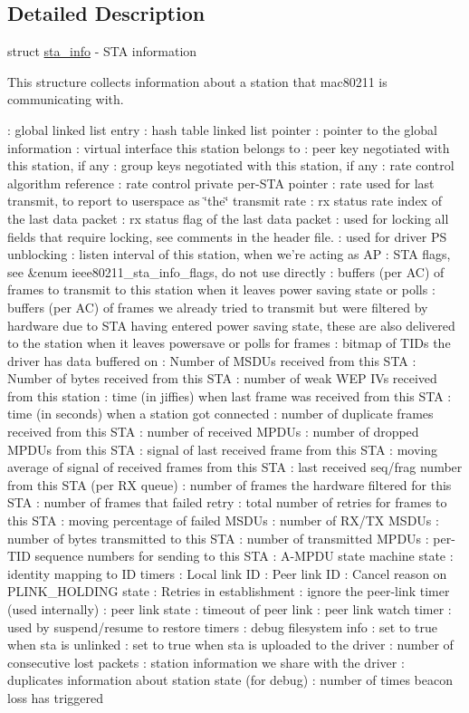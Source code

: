 \subsection{Detailed Description}
struct \hyperlink{structsta__info}{sta\-\_\-info} -\/ S\-T\-A information

This structure collects information about a station that mac80211 is communicating with.

\-: global linked list entry \-: hash table linked list pointer \-: pointer to the global information \-: virtual interface this station belongs to \-: peer key negotiated with this station, if any \-: group keys negotiated with this station, if any \-: rate control algorithm reference \-: rate control private per-\/\-S\-T\-A pointer \-: rate used for last transmit, to report to userspace as \char`\"{}the\char`\"{} transmit rate \-: rx status rate index of the last data packet \-: rx status flag of the last data packet \-: used for locking all fields that require locking, see comments in the header file. \-: used for driver P\-S unblocking \-: listen interval of this station, when we're acting as A\-P \-: S\-T\-A flags, see \&enum ieee80211\-\_\-sta\-\_\-info\-\_\-flags, do not use directly \-: buffers (per A\-C) of frames to transmit to this station when it leaves power saving state or polls \-: buffers (per A\-C) of frames we already tried to transmit but were filtered by hardware due to S\-T\-A having entered power saving state, these are also delivered to the station when it leaves powersave or polls for frames \-: bitmap of T\-I\-Ds the driver has data buffered on \-: Number of M\-S\-D\-Us received from this S\-T\-A \-: Number of bytes received from this S\-T\-A \-: number of weak W\-E\-P I\-Vs received from this station \-: time (in jiffies) when last frame was received from this S\-T\-A \-: time (in seconds) when a station got connected \-: number of duplicate frames received from this S\-T\-A \-: number of received M\-P\-D\-Us \-: number of dropped M\-P\-D\-Us from this S\-T\-A \-: signal of last received frame from this S\-T\-A \-: moving average of signal of received frames from this S\-T\-A \-: last received seq/frag number from this S\-T\-A (per R\-X queue) \-: number of frames the hardware filtered for this S\-T\-A \-: number of frames that failed retry \-: total number of retries for frames to this S\-T\-A \-: moving percentage of failed M\-S\-D\-Us \-: number of R\-X/\-T\-X M\-S\-D\-Us \-: number of bytes transmitted to this S\-T\-A \-: number of transmitted M\-P\-D\-Us \-: per-\/\-T\-I\-D sequence numbers for sending to this S\-T\-A \-: A-\/\-M\-P\-D\-U state machine state \-: identity mapping to I\-D timers \-: Local link I\-D \-: Peer link I\-D \-: Cancel reason on P\-L\-I\-N\-K\-\_\-\-H\-O\-L\-D\-I\-N\-G state \-: Retries in establishment \-: ignore the peer-\/link timer (used internally) \-: peer link state \-: timeout of peer link \-: peer link watch timer \-: used by suspend/resume to restore timers \-: debug filesystem info \-: set to true when sta is unlinked \-: set to true when sta is uploaded to the driver \-: number of consecutive lost packets \-: station information we share with the driver \-: duplicates information about station state (for debug) \-: number of times beacon loss has triggered 

